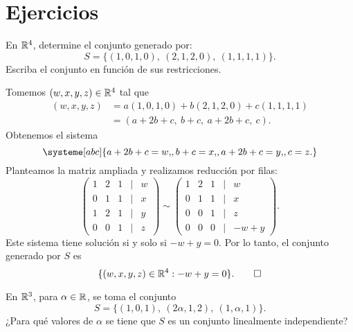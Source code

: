 \documentclass[11pt,a5]{aleph-examen}
\begin{document}
\encabezado

\section*{Ejercicios}

\begin{preguntas}

\item
    En $\mathbb{R}^4$, determine el conjunto generado por:
    \[
        S = \big\{
            (1,0,1,0),\ 
            (2,1,2,0),\  
            (1,1, 1,1)\big\}.
    \]
    Escriba el conjunto en función de sus restricciones.


\begin{respuesta}
    Tomemos $(w,x,y,z)\in\mathbb{R}^4$ tal que
    \begin{align*}
        (w,x,y,z) 
        & = a(1,0,1,0) + b(2,1,2,0) + c(1,1,1,1)\\
        & = (a+2b+c,\ b+c,\ a+2b+c,\ c).
    \end{align*}
    Obtenemos el sistema
    \[
        \systeme[abc]{
            a+2b+c = w{,},
            b+c = x{,},
            a+2b+c = y{,},
            c = z{.}
        }
    \]
    Planteamos la matriz ampliada y realizamos reducción por filas:
    \[
        \begin{pmatrix}
            1 & 2 & 1 & | & w\\
            0 & 1 & 1 & | & x\\
            1 & 2 & 1 & | & y\\
            0 & 0 & 1 & | & z
        \end{pmatrix}
        \sim
        \begin{pmatrix}
            1 & 2 & 1 & | & w\\
            0 & 1 & 1 & | & x\\
            0 & 0 & 1 & | & z\\
            0 & 0 & 0 & | & - w + y
        \end{pmatrix}.
    \]
    Este sistema tiene solución si y solo si $-w + y = 0$. Por lo tanto, el conjunto generado por $S$ es
    \[
        \{
            (w,x,y,z)\in\mathbb{R}^4 : -w + y = 0
        \}.\qedhere
    \]
\end{respuesta}

\item
    En $\mathbb{R}^3$, para $\alpha \in \mathbb{R}$, se toma el conjunto
    \[
        S = \big\{
            (1,0,1),\ 
            (2\alpha,1,2),\  
            (1, \alpha, 1)\big\}.
    \]
    ¿Para qué valores de $\alpha$ se tiene que $S$ es un conjunto linealmente independiente?



\end{preguntas}
\end{document}
